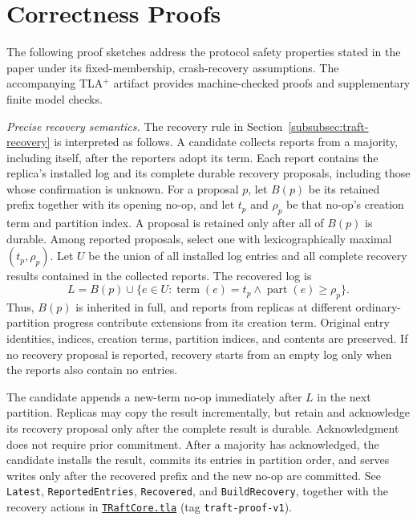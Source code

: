 \section{Correctness Proofs}
\label{sec:appendix-correctness}
The following proof sketches address the protocol safety properties stated in the paper under its fixed-membership, crash-recovery assumptions. The accompanying TLA$^+$ artifact provides machine-checked proofs and supplementary finite model checks.

\noindent\textit{Precise recovery semantics.}
The recovery rule in Section~\ref{subsubsec:traft-recovery} is interpreted
as follows. A candidate collects reports from a majority, including itself,
after the reporters adopt its term. Each report contains the replica's
installed log and its complete durable recovery proposals, including those
whose confirmation is unknown. For a proposal $p$, let $B(p)$ be its
retained prefix together with its opening no-op, and let $t_p$ and
$\rho_p$ be that no-op's creation term and partition index. A proposal is
retained only after all of $B(p)$ is durable. Among reported proposals,
select one with lexicographically maximal $(t_p,\rho_p)$. Let $U$ be the
union of all installed log entries and all complete recovery results
contained in the collected reports. The recovered log is
\[
  L = B(p) \cup
      \{e\in U : \operatorname{term}(e)=t_p
                     \land \operatorname{part}(e)\geq\rho_p\}.
\]
Thus, $B(p)$ is inherited in full, and reports from replicas at different
ordinary-partition progress contribute extensions from its creation term.
Original entry identities, indices, creation terms, partition indices,
and contents are preserved. If no recovery proposal is reported, recovery
starts from an empty log only when the reports also contain no entries.

The candidate appends a new-term no-op immediately after $L$ in the next
partition. Replicas may copy the result incrementally, but retain and
acknowledge its recovery proposal only after the complete result is
durable. Acknowledgment does not require prior commitment. After a majority
has acknowledged, the candidate installs the result, commits its entries
in partition order, and serves writes only after the recovered prefix and
the new no-op are committed. See
\texttt{Latest}, \texttt{ReportedEntries}, \texttt{Recovered}, and
\texttt{BuildRecovery}, together with the recovery actions in
\href{https://github.com/LittleHealth/traft/blob/traft-proof-v1/tlaplus-proof/models/TRaftCore.tla}{\texttt{TRaftCore.tla}}
(tag \texttt{traft-proof-v1}).

